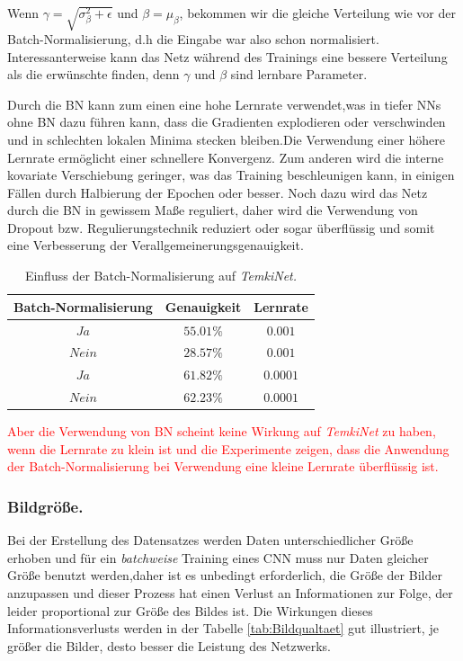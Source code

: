 \documentclass[12pt,a4paper]{scrartcl}
\numberwithin{equation}{section}
\begin{document}
Wenn $\gamma = \sqrt{\sigma_\beta^2 + \epsilon}$ und $\beta = \mu_\beta $, bekommen wir die gleiche Verteilung wie vor der Batch-Normalisierung, d.h die Eingabe war also schon normalisiert. Interessanterweise kann das Netz während des Trainings eine bessere Verteilung als die erwünschte finden, denn $\gamma$ und $\beta$ sind lernbare Parameter.

Durch die BN kann zum einen eine hohe Lernrate verwendet,was in tiefer \acsp{NN} ohne BN dazu führen kann, dass die Gradienten explodieren oder verschwinden und in schlechten lokalen Minima stecken bleiben.Die Verwendung einer höhere Lernrate ermöglicht einer schnellere Konvergenz.
Zum anderen wird die interne kovariate Verschiebung geringer, was das Training beschleunigen kann, in einigen Fällen durch Halbierung der Epochen oder besser. Noch dazu wird das Netz durch die BN in gewissem Maße reguliert, daher wird die Verwendung von Dropout bzw. Regulierungstechnik reduziert oder sogar überflüssig und somit eine Verbesserung der Verallgemeinerungsgenauigkeit.

\begin{table}[ht]
	\centering
	\begin{tabular}{*{3}{|c}| }
		\hline
		Batch-Normalisierung 	& Genauigkeit & Lernrate\\ \hline
		$ Ja $		&$ 55.01\% $  &$0.001$ 	\\ \hline	
		$ Nein $	&$28.57 \% $  &$0.001 $	\\ \hline
		$ Ja $		&$ 61.82\% $  &$0.0001$	\\ \hline
		$ Nein $	&$ 62.23\% $  &$0.0001$	\\ \hline

	\end{tabular}
	\caption{Einfluss der Batch-Normalisierung auf \textit{TemkiNet.}}
	\label{tab:batchnormalisierung}
\end{table}
 \textcolor{red}{Aber die Verwendung von BN scheint keine Wirkung auf \textit{TemkiNet} zu haben, wenn die Lernrate zu klein ist und die Experimente zeigen, dass die Anwendung der Batch-Normalisierung bei Verwendung eine kleine Lernrate überflüssig ist.}
\subsubsection{Bildgröße.}	
Bei der Erstellung des Datensatzes werden Daten unterschiedlicher Größe erhoben und für ein \textit{batchweise} Training eines CNN muss nur Daten gleicher Größe benutzt werden,daher ist es unbedingt erforderlich, die Größe der Bilder anzupassen und dieser Prozess hat einen Verlust an Informationen zur Folge, der leider proportional zur Größe des Bildes ist. Die Wirkungen dieses Informationsverlusts werden in der Tabelle \ref{tab:Bildqualtaet} gut illustriert, je größer die Bilder, desto besser die Leistung des Netzwerks.
	
\end{document}
